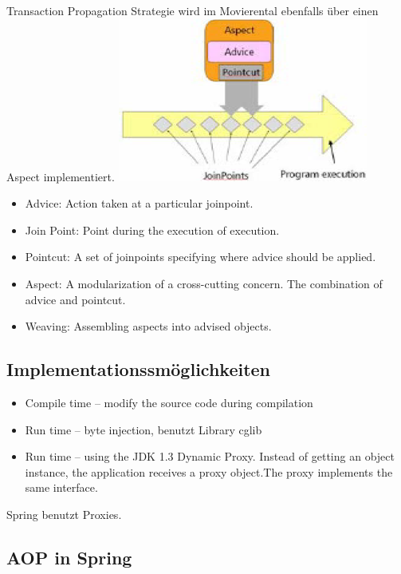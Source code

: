 \documentclass[10pt]{scrartcl}
\begin{document}
Transaction Propagation Strategie wird im Movierental ebenfalls über einen Aspect implementiert.\newline
\includegraphics[scale=1.0]{aopterminology.png}\\
\begin{itemize}
	\item Advice: Action taken at a particular joinpoint.
	\item Join Point: Point during the execution of execution.
	\item Pointcut: A set of joinpoints specifying where advice should be applied.
	\item Aspect: A modularization of a cross-cutting concern. The combination of advice and pointcut.
	\item Weaving: Assembling aspects into advised objects.
\end{itemize}

\subsection{Implementationssmöglichkeiten}
\begin{itemize}
	\item Compile time – modify the source code during compilation
	\item Run time – byte injection, benutzt Library cglib
	\item Run time – using the JDK 1.3 Dynamic Proxy. Instead of getting an object instance, the application receives a proxy object.The proxy implements the same interface.
\end{itemize}
Spring benutzt Proxies.

\subsection{AOP in Spring}


\end{document}
